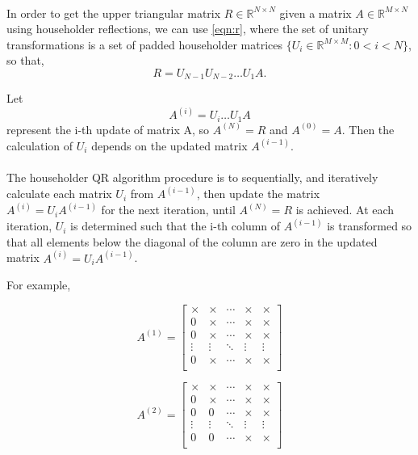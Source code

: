 \documentclass{article}
\begin{document}
\paragraph{}
In order to get the upper triangular matrix $R \in\mathbb{R}^{N\times{}N}$ given a matrix $A \in\mathbb{R}^{M\times{}N}$ using householder reflections, we can use \eqref{eqn:r}, where the set of unitary transformations is a set of padded householder matrices $\{U_i\in\mathbb{R}^{M\times{}M} : 0 < i < N\}$, so that,
\begin{equation}
R = U_{N-1} U_{N-2} \dots U_1A.
\end{equation}

Let 
\begin{equation}
A^{(i)}=U_{i} \dots U_1A
\end{equation}
represent the i-th update of matrix A, so $A^{(N)}=R$ and $A^{(0)} = A$. Then the calculation of $U_i$ depends on the updated matrix $A^{(i-1)}$.
\paragraph{}
The householder QR algorithm procedure is to sequentially, and iteratively calculate each matrix $U_i$ from $A^{(i-1)}$, then update the matrix $A^{(i)} = U_iA^{(i-1)}$ for the next iteration, until $A^{(N)}=R$ is achieved. At each iteration, $U_i$ is determined such that the i-th column of $A^{(i-1)}$ is transformed so that all elements below the diagonal of the column are zero in the updated matrix $A^{(i)} = U_iA^{(i-1)}$.

For example,

\begin{equation}
A^{(1)} =
\begin{bmatrix}
\times & \times & \cdots & \times & \times\\
0 & \times  & \cdots & \times & \times\\
0 & \times  & \cdots & \times & \times\\
\vdots & \vdots  & \ddots & \vdots & \vdots\\
0 & \times  & \cdots & \times & \times\\
\end{bmatrix}
\end{equation}

\begin{equation}
A^{(2)} =
\begin{bmatrix}
\times & \times & \cdots & \times & \times\\
0 & \times  & \cdots & \times & \times\\
0 & 0 & \cdots & \times & \times\\
\vdots & \vdots  & \ddots & \vdots & \vdots\\
0 & 0  & \cdots & \times & \times\\
\end{bmatrix}
\end{equation}
\end{document}
